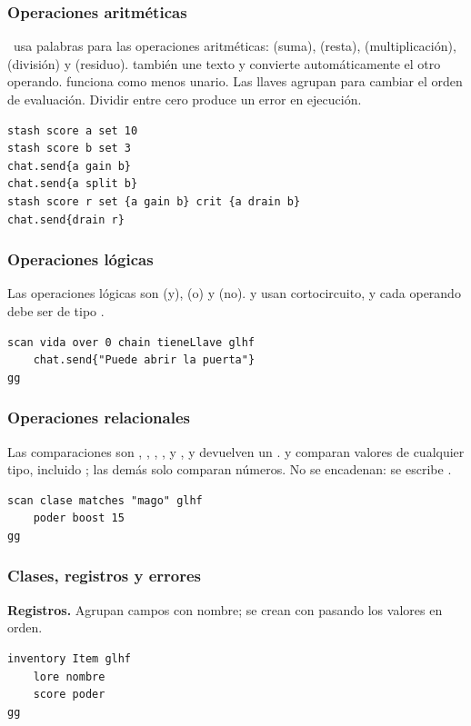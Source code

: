\subsubsection{Operaciones aritméticas}

\ggez\ usa palabras para las operaciones aritméticas:  (suma),  (resta),  (multiplicación),  (división) y  (residuo).  también une texto y convierte automáticamente el otro operando.  funciona como menos unario. Las llaves \kw{\{ \}} agrupan para cambiar el orden de evaluación. Dividir entre cero produce un error en ejecución.
\begin{lstlisting}
stash score a set 10
stash score b set 3
chat.send{a gain b}
chat.send{a split b}
stash score r set {a gain b} crit {a drain b}
chat.send{drain r}
\end{lstlisting}

\subsubsection{Operaciones lógicas}

Las operaciones lógicas son  (y),  (o) y  (no).  y  usan cortocircuito, y cada operando debe ser de tipo .
\begin{lstlisting}
scan vida over 0 chain tieneLlave glhf
    chat.send{"Puede abrir la puerta"}
gg
\end{lstlisting}

\subsubsection{Operaciones relacionales}

Las comparaciones son , , , ,  y , y devuelven un .  y  comparan valores de cualquier tipo, incluido ; las demás solo comparan números. No se encadenan: se escribe .
\begin{lstlisting}
scan clase matches "mago" glhf
    poder boost 15
gg
\end{lstlisting}

\subsubsection{Clases, registros y errores}

\textbf{Registros.} Agrupan campos con nombre; se crean con  pasando los valores en orden.
\begin{lstlisting}
inventory Item glhf
    lore nombre
    score poder
gg
\end{lstlisting}

